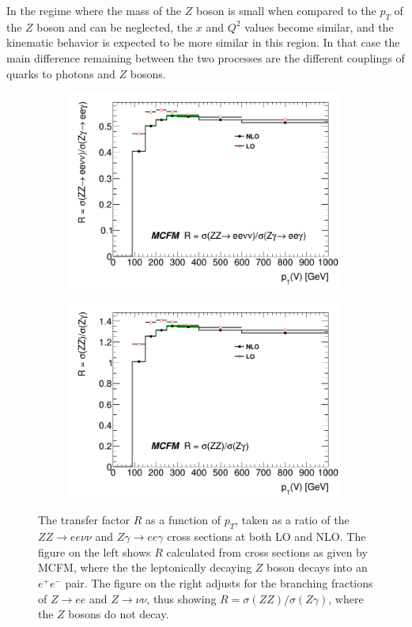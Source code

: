 \documentclass[12pt,a4paper,openright,twoside]{report}
\begin{document}
In the regime where the mass of the $Z$ boson is small when compared to the $p_T$ of the $Z$ boson and can be neglected, the $x$ and $Q^2$ values become similar, and the kinematic behavior is expected to be more similar in this region. In that case the main difference remaining between the two processes are the different couplings of quarks to photons and $Z$ bosons. 
\begin{figure}[H]
\centering
	\begin{subfigure}{0.49\textwidth}
		\includegraphics[width=\linewidth]{R.png}
		\caption{}
		\label{fig:Rcurve}
	\end{subfigure}
	\begin{subfigure}{0.49\textwidth}
		\includegraphics[width=\linewidth]{R_BR.png}
		\caption{}
		\label{fig:RcurveBR}
	\end{subfigure}
	\caption{The transfer factor $R$ as a function of $p_T$, taken as a ratio of  the $ZZ\to ee\nu\nu$ and $Z\gamma\to ee\gamma$ cross sections at both LO and NLO. The figure on the left shows $R$ calculated from cross sections as given by MCFM, where the the leptonically decaying $Z$ boson decays into an $e^+e^-$ pair. The figure on the right adjusts for the branching fractions of $Z\to ee$ and $Z\to\nu\nu$, thus showing $R = \sigma(ZZ)/\sigma(Z\gamma)$, where the $Z$ bosons do not decay.}
\end{figure}
\end{document}
